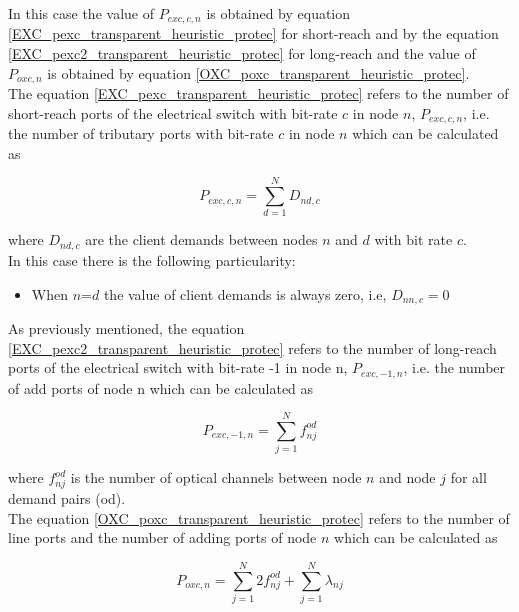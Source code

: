 In this case the value of $P_{exc,c,n}$ is obtained by equation \ref{EXC_pexc_transparent_heuristic_protec} for short-reach and by the equation \ref{EXC_pexc2_transparent_heuristic_protec} for long-reach and the value of $P_{oxc,n}$ is obtained by equation \ref{OXC_poxc_transparent_heuristic_protec}.\\

The equation \ref{EXC_pexc_transparent_heuristic_protec} refers to the number of short-reach ports of the electrical switch with bit-rate $c$ in node $n$, $P_{exc,c,n}$, i.e. the number of tributary ports with bit-rate $c$ in node $n$ which can be calculated as

\begin{equation}
P_{exc,c,n} = \sum_{d=1}^{N} D_{nd,c}
\label{EXC_pexc_transparent_heuristic_protec}
\end{equation}

\noindent
where $D_{nd,c}$ are the client demands between nodes $n$ and $d$ with bit rate $c$.\\

\noindent
In this case there is the following particularity:

\begin{itemize}
  \item When $n$=$d$ the value of client demands is always zero, i.e, $D_{nn,c}=0$
\end{itemize}

As previously mentioned, the equation \ref{EXC_pexc2_transparent_heuristic_protec} refers to the number of long-reach ports of the electrical switch with bit-rate -1 in node n, $P_{exc,-1,n}$, i.e. the number of add ports of node n which can be calculated as

\begin{equation}
P_{exc,-1,n} = \sum_{j=1}^{N} f_{nj}^{od}
\label{EXC_pexc2_transparent_heuristic_protec}
\end{equation}

\noindent
where $f_{nj}^{od}$ is the number of optical channels between node $n$ and node $j$ for all demand pairs (od).\\

\vspace{11pt}
The equation \ref{OXC_poxc_transparent_heuristic_protec} refers to the number of line ports and the number of adding ports of node $n$ which can be calculated as

\begin{equation}
P_{oxc,n} = \sum_{j=1}^{N} 2 f_{nj}^{od} + \sum_{j=1}^{N} \lambda_{nj}
\label{OXC_poxc_transparent_heuristic_protec}
\end{equation}

